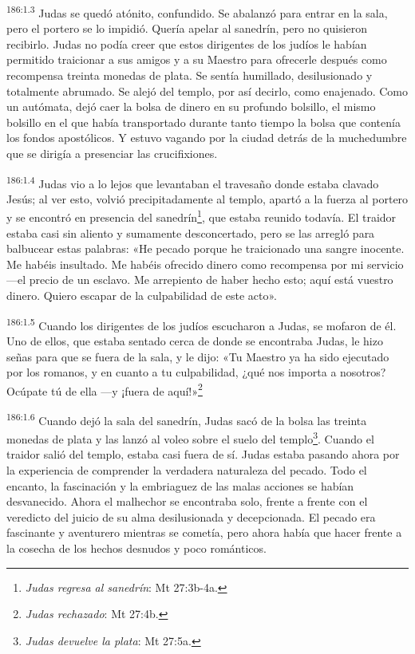 \par 
\textsuperscript{186:1.3} Judas se quedó atónito, confundido. Se abalanzó para entrar en la sala, pero el portero se lo impidió. Quería apelar al sanedrín, pero no quisieron recibirlo. Judas no podía creer que estos dirigentes de los judíos le habían permitido traicionar a sus amigos y a su Maestro para ofrecerle después como recompensa treinta monedas de plata. Se sentía humillado, desilusionado y totalmente abrumado. Se alejó del templo, por así decirlo, como enajenado. Como un autómata, dejó caer la bolsa de dinero en su profundo bolsillo, el mismo bolsillo en el que había transportado durante tanto tiempo la bolsa que contenía los fondos apostólicos. Y estuvo vagando por la ciudad detrás de la muchedumbre que se dirigía a presenciar las crucifixiones.

\par 
\textsuperscript{186:1.4} Judas vio a lo lejos que levantaban el travesaño donde estaba clavado Jesús; al ver esto, volvió precipitadamente al templo, apartó a la fuerza al portero y se encontró en presencia del sanedrín\footnote{\textit{Judas regresa al sanedrín}: Mt 27:3b-4a.}, que estaba reunido todavía. El traidor estaba casi sin aliento y sumamente desconcertado, pero se las arregló para balbucear estas palabras: «He pecado porque he traicionado una sangre inocente. Me habéis insultado. Me habéis ofrecido dinero como recompensa por mi servicio ---el precio de un esclavo. Me arrepiento de haber hecho esto; aquí está vuestro dinero. Quiero escapar de la culpabilidad de este acto».

\par 
\textsuperscript{186:1.5} Cuando los dirigentes de los judíos escucharon a Judas, se mofaron de él. Uno de ellos, que estaba sentado cerca de donde se encontraba Judas, le hizo señas para que se fuera de la sala, y le dijo: «Tu Maestro ya ha sido ejecutado por los romanos, y en cuanto a tu culpabilidad, ¿qué nos importa a nosotros? Ocúpate tú de ella ---y ¡fuera de aquí!»\footnote{\textit{Judas rechazado}: Mt 27:4b.}

\par 
\textsuperscript{186:1.6} Cuando dejó la sala del sanedrín, Judas sacó de la bolsa las treinta monedas de plata y las lanzó al voleo sobre el suelo del templo\footnote{\textit{Judas devuelve la plata}: Mt 27:5a.}. Cuando el traidor salió del templo, estaba casi fuera de sí. Judas estaba pasando ahora por la experiencia de comprender la verdadera naturaleza del pecado. Todo el encanto, la fascinación y la embriaguez de las malas acciones se habían desvanecido. Ahora el malhechor se encontraba solo, frente a frente con el veredicto del juicio de su alma desilusionada y decepcionada. El pecado era fascinante y aventurero mientras se cometía, pero ahora había que hacer frente a la cosecha de los hechos desnudos y poco románticos.

